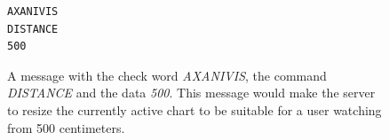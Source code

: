 \documentclass[12pt,a4paper,notitlepage]{report}
\begin{document}

\begin{figure}[h]
  \lstset{%
    basicstyle=\ttfamily\bfseries,
    xleftmargin=.4\textwidth, xrightmargin=.2\textwidth
  }
\begin{lstlisting}
AXANIVIS
DISTANCE
500
\end{lstlisting}
\caption{A message with the check word \textit{AXANIVIS}, the command \mbox{\textit{DISTANCE}} and the data \textit{500}. This message would make the server to resize the currently active chart to be suitable for a user watching from 500 centimeters. \label{fig:example_message}}
\end{figure}
\end{document}
